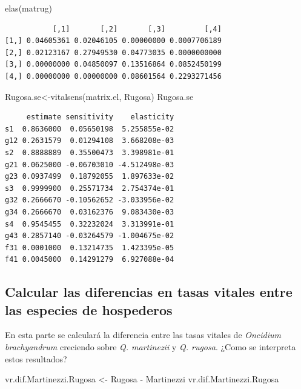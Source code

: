 \documentclass[
  12pt,
  letterpaper,
]{book}
\newenvironment{Shaded}{\begin{snugshade}}{\end{snugshade}}
\newcommand{\FunctionTok}[1]{\textcolor[rgb]{0.28,0.35,0.67}{#1}}
\newcommand{\NormalTok}[1]{\textcolor[rgb]{0.00,0.23,0.31}{#1}}
\newcommand{\OtherTok}[1]{\textcolor[rgb]{0.00,0.23,0.31}{#1}}
\newcommand{\SpecialCharTok}[1]{\textcolor[rgb]{0.37,0.37,0.37}{#1}}
\begin{document}
\begin{Shaded}
\begin{Highlighting}[]
\FunctionTok{elas}\NormalTok{(matrug)}
\end{Highlighting}
\end{Shaded}

\begin{verbatim}
           [,1]       [,2]       [,3]         [,4]
[1,] 0.04605361 0.02046105 0.00000000 0.0007706189
[2,] 0.02123167 0.27949530 0.04773035 0.0000000000
[3,] 0.00000000 0.04850097 0.13516864 0.0852450199
[4,] 0.00000000 0.00000000 0.08601564 0.2293271456
\end{verbatim}

\begin{Shaded}
\begin{Highlighting}[]
\NormalTok{Rugosa.se}\OtherTok{\textless{}{-}}\FunctionTok{vitalsens}\NormalTok{(matrix.el, Rugosa)}
\NormalTok{Rugosa.se}
\end{Highlighting}
\end{Shaded}

\begin{verbatim}
     estimate sensitivity    elasticity
s1  0.8636000  0.05650198  5.255855e-02
g12 0.2631579  0.01294108  3.668208e-03
s2  0.8888889  0.35500473  3.398981e-01
g21 0.0625000 -0.06703010 -4.512498e-03
g23 0.0937499  0.18792055  1.897633e-02
s3  0.9999900  0.25571734  2.754374e-01
g32 0.2666670 -0.10562652 -3.033956e-02
g34 0.2666670  0.03162376  9.083430e-03
s4  0.9545455  0.32232024  3.313991e-01
g43 0.2857140 -0.03264579 -1.004675e-02
f31 0.0001000  0.13214735  1.423395e-05
f41 0.0045000  0.14291279  6.927088e-04
\end{verbatim}

\subsection{Calcular las diferencias en tasas vitales entre las especies
de
hospederos}\label{calcular-las-diferencias-en-tasas-vitales-entre-las-especies-de-hospederos}

En esta parte se calculará la diferencia entre las tasas vitales de
\emph{Oncidium brachyandrum} creciendo sobre \emph{Q. martinezii} y
\emph{Q. rugosa}. ¿Como se interpreta estos resultados?

\begin{Shaded}
\begin{Highlighting}[]
\NormalTok{vr.dif.Martinezzi.Rugosa }\OtherTok{\textless{}{-}}\NormalTok{ Rugosa }\SpecialCharTok{{-}}\NormalTok{ Martinezzi}
\NormalTok{vr.dif.Martinezzi.Rugosa}
\end{Highlighting}
\end{Shaded}
\end{document}
